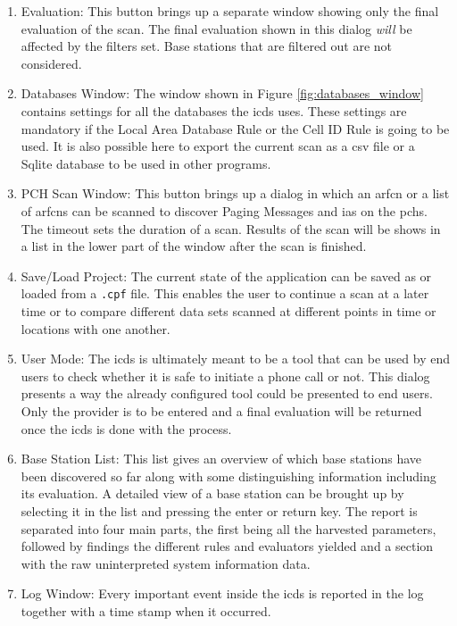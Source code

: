 \begin{enumerate}
\item Evaluation: This button brings up a separate window showing only the final evaluation of the scan.
The final evaluation shown in this dialog \emph{will} be affected by the filters set.
Base stations that are filtered out are not considered.

\item Databases Window: The window shown in Figure \ref{fig:databases_window} contains settings for all the databases the \gls{icds} uses.
These settings are mandatory if the Local Area Database Rule or the Cell ID Rule is going to be used.
It is also possible here to export the current scan as a \gls{csv} file or a Sqlite database to be used in other programs.

\item PCH Scan Window: This button brings up a dialog in which an \gls{arfcn} or a list of \glspl{arfcn} can be scanned to discover Paging Messages and \glspl{ia} on the \glspl{pch}.
The timeout sets the duration of a scan.
Results of the scan will be shows in a list in the lower part of the window after the scan is finished.

\item Save/Load Project: The current state of the application can be saved as or loaded from a \texttt{.cpf} file.
This enables the user to continue a scan at a later time or to compare different data sets scanned at different points in time or locations with one another.

\item User Mode: The \gls{icds} is ultimately meant to be a tool that can be used by end users to check whether it is safe to initiate a phone call or not.
This dialog presents a way the already configured tool could be presented to end users.
Only the provider is to be entered and a final evaluation will be returned once the \gls{icds} is done with the process.

\item Base Station List: This list gives an overview of which base stations have been discovered so far along with some distinguishing information including its evaluation.
A detailed view of a base station can be brought up by selecting it in the list and pressing the enter or return key.
The report is separated into four main parts, the first being all the harvested parameters, followed by findings the different rules and evaluators yielded and a section with the raw uninterpreted system information data.
 
\item Log Window: Every important event inside the \gls{icds} is reported in the log together with a time stamp when it occurred.


\end{enumerate}
